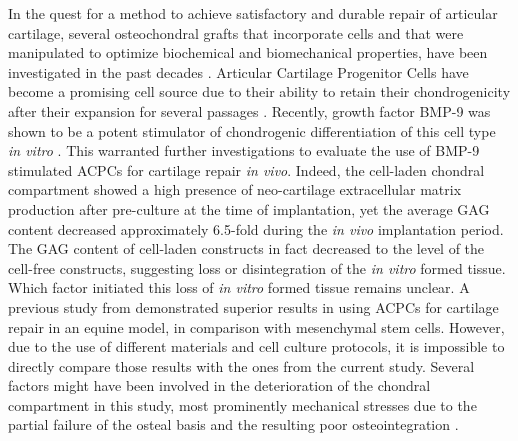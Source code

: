 \documentclass[twocolumn, serif, empirical, authordate, seplic]{jote-article}
\begin{document}
In the quest for a method to achieve satisfactory and durable repair of articular cartilage, several osteochondral grafts that incorporate cells and that were manipulated to optimize biochemical and biomechanical properties, have been investigated in the past decades \parencite{Huang2016}. Articular Cartilage Progenitor Cells have become a promising cell source due to their ability to retain their chondrogenicity after their expansion for several passages \parencite{Williams2010}. Recently, growth factor BMP-9 was shown to be a potent stimulator of chondrogenic differentiation of this cell type \emph{in vitro} \parencite{Morgan2020}. This warranted further investigations to evaluate the use of BMP-9 stimulated ACPCs for cartilage repair \emph{in vivo}. Indeed, the cell-laden chondral compartment showed a high presence of neo-cartilage extracellular matrix production after pre-culture at the time of implantation, yet the average GAG content decreased approximately 6.5-fold during the \emph{in vivo} implantation period. The GAG content of cell-laden constructs in fact decreased to the level of the cell-free constructs, suggesting loss or disintegration of the \emph{in vitro}
formed tissue. Which factor initiated this loss of \emph{in vitro}
formed tissue remains unclear. A previous study from \textcite{McCarthy2012} demonstrated superior results in using ACPCs for cartilage repair in an equine model, in comparison with mesenchymal stem cells. However, due to the use of different materials and cell culture protocols, it is impossible to directly compare those results with the ones from the current study. Several factors might have been involved in the deterioration of the chondral compartment in this study, most prominently mechanical stresses due to the partial failure of the osteal basis and the resulting poor osteointegration \parencite{Heuijerjans2018}.
\end{document}
